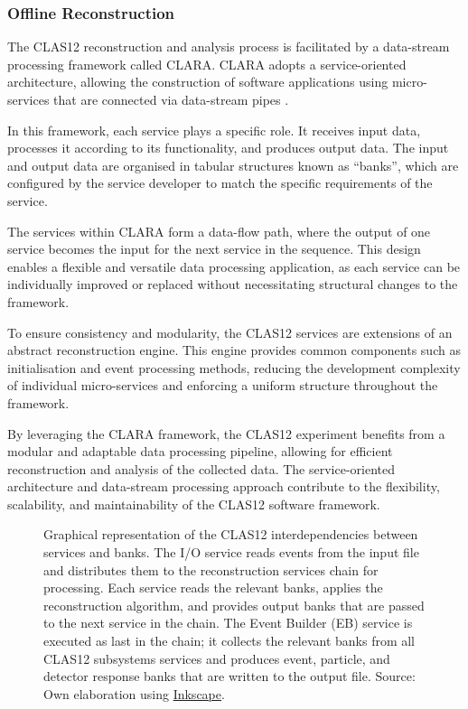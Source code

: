\subsubsection{Offline Reconstruction}
\label{11.230::offline_reconstruction}
    The CLAS12 reconstruction and analysis process is facilitated by a data-stream processing framework called CLARA.
    CLARA adopts a service-oriented architecture, allowing the construction of software applications using micro-services that are connected via data-stream pipes \cite{gyurgyan2016}.

    In this framework, each service plays a specific role.
    It receives input data, processes it according to its functionality, and produces output data.
    The input and output data are organised in tabular structures known as ``banks'', which are configured by the service developer to match the specific requirements of the service.

    The services within CLARA form a data-flow path, where the output of one service becomes the input for the next service in the sequence.
    This design enables a flexible and versatile data processing application, as each service can be individually improved or replaced without necessitating structural changes to the framework.

    To ensure consistency and modularity, the CLAS12 services are extensions of an abstract reconstruction engine.
    This engine provides common components such as initialisation and event processing methods, reducing the development complexity of individual micro-services and enforcing a uniform structure throughout the framework.

    By leveraging the CLARA framework, the CLAS12 experiment benefits from a modular and adaptable data processing pipeline, allowing for efficient reconstruction and analysis of the collected data.
    The service-oriented architecture and data-stream processing approach contribute to the flexibility, scalability, and maintainability of the CLAS12 software framework.

    \begin{figure}[b!]
        \centering{}
        \caption[CLAS12 Reconstruction Chain.]{Graphical representation of the CLAS12 interdependencies between services and banks.
        The I/O service reads events from the input file and distributes them to the reconstruction services chain for processing.
        Each service reads the relevant banks, applies the reconstruction algorithm, and provides output banks that are passed to the next service in the chain.
        The Event Builder (EB) service is executed as last in the chain; it collects the relevant banks from all CLAS12 subsystems services and produces event, particle, and detector response banks that are written to the output file.
        Source: Own elaboration using \hyperlink{inkscape.org/}{Inkscape}.}
        \label{fig::11.230::recon_chain}
    \end{figure}

